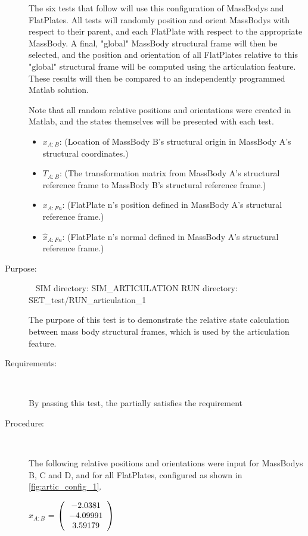 \begin{description}
The six tests that follow will use this configuration of MassBodys
and FlatPlates. All tests will randomly position and orient MassBodys
with respect to their parent, and each FlatPlate with respect to
the appropriate MassBody. A final, "global" MassBody structural frame will
then be selected, and the position and orientation of all FlatPlates
relative to this "global" structural frame will be computed using the
articulation feature. These results will then be compared to an
independently programmed Matlab solution.

Note that all random relative positions and orientations were created in Matlab,
and the states themselves will be presented with each test.

\begin{itemize}
\item{$x_{A:B}$}: (Location of MassBody B's
structural origin in MassBody A's structural coordinates.)
\item{$T_{A:B}$}: (The transformation matrix from MassBody
A's structural reference frame to MassBody B's structural reference frame.)
\item{$x_{A:Fn}$}: (FlatPlate n's position defined in MassBody A's structural
reference frame.)
\item{$\hat{x}_{A:Fn}$}: (FlatPlate n's normal defined in MassBody A's structural
reference frame.)
\end{itemize}

\item[Purpose:] \ \newline
SIM directory: SIM\_ARTICULATION
RUN directory: SET\_test/RUN\_articulation\_1

The purpose of this test is to demonstrate the relative state calculation
between mass body structural frames, which is used by the articulation
feature.

\item[Requirements:] \ \newline

By passing this test, the \ModelDesc partially satisfies
the requirement 

\item[Procedure:] \ \newline

The following relative positions and orientations were input for MassBodys
B, C and D, and for all FlatPlates, configured as shown in
\ref{fig:artic_config_1}.

$x_{A:B}$ = $\left( \begin{array} {ccc}    -2.0381 \\   -4.09991 \\    3.59179 
\end{array} \right)\\ \\$


\end{description}
